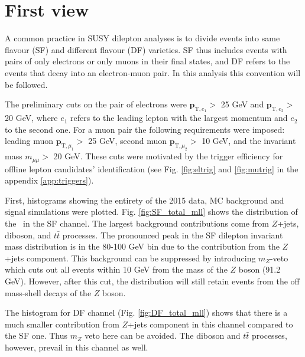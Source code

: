 \section{First view}

A common practice in SUSY dilepton analyses is to divide events into same flavour (SF) and different flavour (DF) varieties. SF thus includes events with pairs of only electrons or only muons in their final states, and DF refers to the events that decay into an electron-muon pair. In this analysis this convention will be followed.

The preliminary cuts on the pair of electrons were $\mathbf{p}_{\text{T},e_1}>$ 25 GeV and $\mathbf{p}_{\text{T},e_2}>$ 20 GeV, where $e_1$ refers to the leading lepton with the largest momentum and $e_2$ to the second one.  For a muon pair the following requirements were imposed: leading muon $\mathbf{p}_{\text{T},\mu_1}>$ 25 GeV, second muon $\mathbf{p}_{\text{T},\mu_2}>$ 10 GeV, and the invariant mass $m_{\mu \mu}>$ 20 GeV. These cuts were motivated by the trigger efficiency for offline lepton candidates' identification (see Fig. \ref{fig:eltrig} and \ref{fig:mutrig} in the appendix \ref{app:triggers}).

First, histograms showing the entirety of the 2015 data, MC background and signal simulations were plotted. Fig. \ref{fig:SF_total_mll} shows the distribution of the \dileptonmass \, in the SF channel. The largest background contributions come from $Z$+jets, diboson, and $t\bar{t}$ processes. 
The pronounced peak in the SF dilepton invariant mass distribution is in the 80-100 GeV bin due to the contribution from the $Z$+jets component. This background can be suppressed by introducing $m_Z$-veto which cuts out all events within 10 GeV from the mass of the $Z$ boson (91.2 GeV). However, after this cut, the distribution will still retain events from the off mass-shell decays of the $Z$ boson. 

The histogram for DF channel (Fig. \ref{fig:DF_total_mll}) shows that there is a much smaller contribution from $Z$+jets component in this channel compared to the SF one. Thus $m_Z$ veto here can be avoided. The diboson and $t\bar{t}$ processes, however, prevail in this channel as well. 

